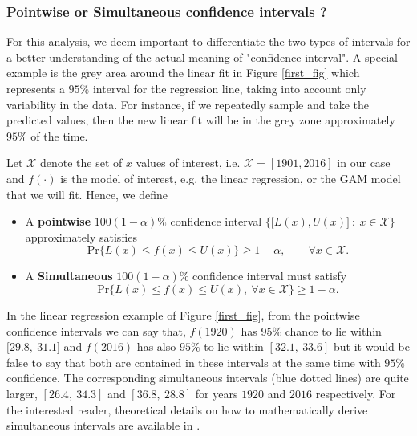 \subsubsection*{Pointwise or Simultaneous confidence intervals ?}

For this analysis, we deem important to differentiate the two types of intervals for a better understanding of the actual meaning of "confidence interval". A special example is the grey area around the linear fit in Figure \ref{first_fig} which represents a $95\%$ interval for the regression line, taking into account only variability in the data. For instance, if we repeatedly sample and take the predicted values, then the new linear fit will be in the grey zone approximately $95\%$ of the time.

Let $\mathcal{X}$ denote the set of $x$ values of interest, i.e. $\mathcal{X}=[1901,2016]$ in our case and $f(\cdot)$ is the model of interest, e.g. the linear regression, or the GAM model that we will fit. Hence, we define 
\begin{itemize}
	\item A \textbf{pointwise} $100(1-\alpha)\%$ confidence interval $\Big\{\big[L(x),U(x)\big] \ : \ x\in \mathcal{X}\Big\}$ approximately satisfies
	\begin{equation}
	\text{Pr}\Big\{L(x)\leq f(x)\leq U(x)\Big\}\geq 1-\alpha, \qquad \forall x\in\mathcal{X}.
	\end{equation}
	
	\item A \textbf{Simultaneous} $100(1-\alpha)\%$ confidence interval must satisfy 
	\begin{equation}
	\text{Pr}\Big\{L(x)\leq f(x)\leq U(x), \ \forall x\in\mathcal{X}\Big\}\geq 1-\alpha.
	\end{equation}
\end{itemize} 
In the linear regression example of Figure \ref{first_fig}, from the pointwise confidence intervals we can say that, $f(1920)$ has $95\%$ chance to lie within $[29.8,\ 31.1$] and $f(2016)$ has also $95\%$ to lie within $[32.1, \ 33.6]$ but it would be false to say that both are contained in these intervals at the same time with $95\%$ confidence. The corresponding simultaneous intervals (blue dotted lines) are quite larger, $[26.4, \ 34.3]$ and $[36.8, \ 28.8]$ for years $1920$ and $2016$ respectively.
For the interested reader, theoretical details on how to mathematically derive simultaneous intervals are available in \citet[pp.142-144]{ruppert_semiparametric_2003}.


